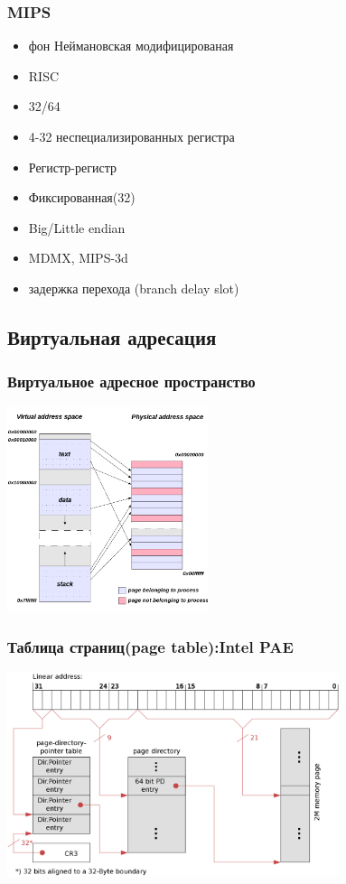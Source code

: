 \begin{frame}
  \frametitle{MIPS}
  \begin{itemize}
      \item фон Неймановская модифицированая
      \item RISC
      \item 32/64
      \item 4-32 неспециализированных регистра
      \item Регистр-регистр
      \item Фиксированная(32)
      \item Big/Little endian
      \item MDMX, MIPS-3d
      \item задержка перехода (branch delay slot)
   \end{itemize}
\end{frame}
\subsection{Виртуальная адресация}
\begin{frame}
  \frametitle{Виртуальное адресное пространство}
  \begin{center}
    \includegraphics[height=6cm]{Virtual_address_space_and_physical_address_space_relationship.png}
  \end{center}
\end{frame}
\begin{frame}
  \frametitle{Таблица страниц(page table):Intel PAE}
  \begin{center}
    \includegraphics[height=6cm]{X86_Paging_PAE_2M.png}
  \end{center}
\end{frame}

